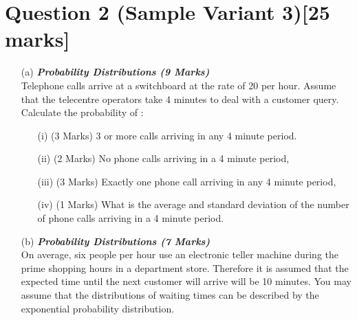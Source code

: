\section*{Question 2 (Sample Variant 3)[25 marks]}
\begin{itemize}

\item[(a)] \textbf{\textit{Probability Distributions (9 Marks)}}\\
Telephone calls arrive at a switchboard at the rate of 20 per hour.  Assume that the telecentre operators take 4 minutes to deal with a customer query.  Calculate the probability of :
\begin{itemize} 
\item[(i)] (3 Marks)                 3 or more calls arriving in any 4 minute period.
\item[(ii)] (2 Marks)               No phone calls arriving in a 4 minute period,
\item[(iii)] (3 Marks)              Exactly one phone call arriving in any 4 minute period,
\item[(iv)] (1 Marks)             What is the average and standard deviation of the number of phone calls arriving in a 4 minute period.
\end{itemize}


\bigskip
\item[(b)] \textbf{\textit{Probability Distributions (7 Marks)}}\\ On average, six people per hour use an electronic teller machine during the prime shopping hours in a department store. Therefore it is assumed that the expected time until the next customer will arrive will be 10 minutes. You may assume that the distributions of waiting times can be described by the exponential probability distribution.


\end{itemize}
